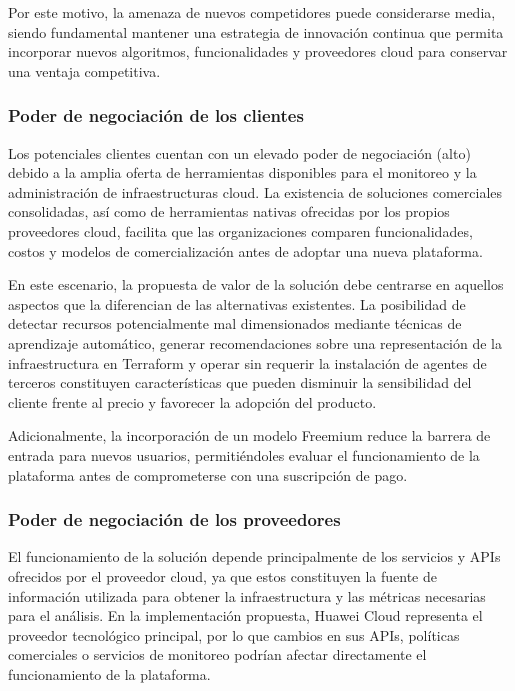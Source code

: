 Por este motivo, la amenaza de nuevos competidores puede considerarse media, siendo fundamental mantener una estrategia de innovación continua que permita incorporar nuevos algoritmos, funcionalidades y proveedores cloud para conservar una ventaja competitiva.

\subsubsection{Poder de negociación de los clientes}

Los potenciales clientes cuentan con un elevado poder de negociación (alto) debido a la amplia oferta de herramientas disponibles para el monitoreo y la administración de infraestructuras cloud. La existencia de soluciones comerciales consolidadas, así como de herramientas nativas ofrecidas por los propios proveedores cloud, facilita que las organizaciones comparen funcionalidades, costos y modelos de comercialización antes de adoptar una nueva plataforma.

En este escenario, la propuesta de valor de la solución debe centrarse en aquellos aspectos que la diferencian de las alternativas existentes. La posibilidad de detectar recursos potencialmente mal dimensionados mediante técnicas de aprendizaje automático, generar recomendaciones sobre una representación de la infraestructura en Terraform y operar sin requerir la instalación de agentes de terceros constituyen características que pueden disminuir la sensibilidad del cliente frente al precio y favorecer la adopción del producto.

Adicionalmente, la incorporación de un modelo Freemium reduce la barrera de entrada para nuevos usuarios, permitiéndoles evaluar el funcionamiento de la plataforma antes de comprometerse con una suscripción de pago.

\subsubsection{Poder de negociación de los proveedores}

El funcionamiento de la solución depende principalmente de los servicios y APIs ofrecidos por el proveedor cloud, ya que estos constituyen la fuente de información utilizada para obtener la infraestructura y las métricas necesarias para el análisis. En la implementación propuesta, Huawei Cloud representa el proveedor tecnológico principal, por lo que cambios en sus APIs, políticas comerciales o servicios de monitoreo podrían afectar directamente el funcionamiento de la plataforma.


